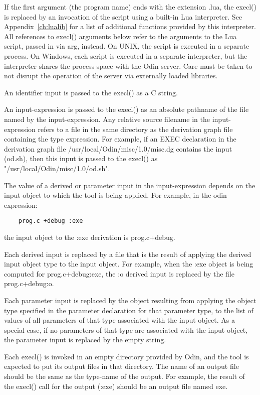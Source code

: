 If the first argument (the program name) ends with the extension {\ex
.lua}, the {\ex execl()} is replaced by an invocation of the script
using a built-in Lua interpreter.  See Appendix~\ref{ch:lualib} for a
list of additional functions provided by this interpreter.  All
references to {\ex execl()} arguments below refer to the arguments to
the Lua script, passed in via {\ex arg}, instead.  On UNIX, the script
is executed in a separate process.  On Windows, each script is
executed in a separate interpreter, but the interpreter shares the
process space with the Odin server.  Care must be taken to not disrupt
the operation of the server via externally loaded libraries.

An identifier input is passed to the {\ex execl()} as a {\ex C} string.

An input-expression is passed to the {\ex execl()} as an absolute pathname
of the file named by the input-expression.
Any relative source filename in the input-expression refers to a file
in the same directory as the derivation graph file containing the type
expression.  For example, if an {\ex EXEC} declaration in the
derivation graph file {\ex /usr/local/Odin/misc/1.0/misc.dg} contains
the input {\ex (od.sh)},
then this input is passed to the {\ex execl()} as
{\ex "/usr/local/Odin/misc/1.0/od.sh"}.

The value of a derived or parameter input in the input-expression
depends on the input object to which the tool is being applied.
For example, in the odin-expression:
\begin{verbatim}
    prog.c +debug :exe
\end{verbatim}
the input object to the {\ex :exe} derivation is {\ex prog.c+debug}.

Each derived input is replaced by a file that is
the result of applying the derived input object type to the input object.
For example, when the {\ex :exe} object is
being computed for {\ex prog.c+debug:exe},
the {\ex :o} derived input is replaced by the file
{\ex prog.c+debug:o}.

Each parameter input is replaced by
the object resulting from applying the object type
specified in the parameter declaration for that parameter type,
to the list of values of all parameters
of that type associated with the input object.
As a special case,
if no parameters of that type are associated with the input object,
the parameter input is replaced by the empty string.

Each {\ex execl()} is invoked in an empty directory provided by Odin,
and the tool is expected to put its output files in that directory.
The name of an output file should be the same as the type-name of
the output.  For example, the result of the {\ex execl()} call
for the output {\ex (:exe)} should be an output file named {\ex exe}.

